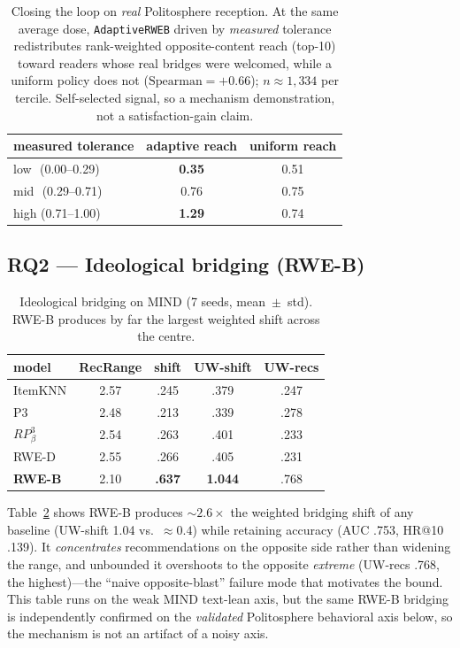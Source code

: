 \documentclass[sigconf,nonacm]{acmart}
\begin{document}
\begin{table}[t]
  \centering
  \caption{Closing the loop on \emph{real} Politosphere reception. At the same average
  dose, \texttt{AdaptiveRWEB} driven by \emph{measured} tolerance redistributes
  rank-weighted opposite-content reach (top-10) toward readers whose real bridges were
  welcomed, while a uniform policy does not ($\mathrm{Spearman}{=}{+}0.66$);
  $n{\approx}1{,}334$ per tercile. Self-selected signal, so a mechanism demonstration,
  not a satisfaction-gain claim.}
  \label{tab:loop}
  \small
  \begin{tabular}{lcc}
    \toprule
    measured tolerance & adaptive reach & uniform reach \\
    \midrule
    low\ \,(0.00--0.29)  & \textbf{0.35} & 0.51 \\
    mid\ \,(0.29--0.71)  & 0.76 & 0.75 \\
    high (0.71--1.00)    & \textbf{1.29} & 0.74 \\
    \bottomrule
  \end{tabular}
\end{table}

\subsection{RQ2 --- Ideological bridging (RWE-B)}
\begin{table}[t]
  \centering
  \caption{Ideological bridging on MIND (7 seeds, mean~$\pm$~std). RWE-B produces
  by far the largest weighted shift across the centre.}
  \label{tab:rq2}
  \small
  \begin{tabular}{lcccc}
    \toprule
    model & RecRange & shift & UW-shift & UW-recs \\
    \midrule
    ItemKNN & 2.57 & .245 & .379 & .247 \\
    P3      & 2.48 & .213 & .339 & .278 \\
    $RP^3_\beta$ & 2.54 & .263 & .401 & .233 \\
    RWE-D   & 2.55 & .266 & .405 & .231 \\
    \textbf{RWE-B} & 2.10 & \textbf{.637} & \textbf{1.044} & .768 \\
    \bottomrule
  \end{tabular}
\end{table}

Table~\ref{tab:rq2} shows RWE-B produces ${\sim}2.6\times$ the weighted bridging
shift of any baseline (UW-shift 1.04 vs.\ ${\approx}0.4$) while retaining accuracy
(AUC .753, HR@10 .139). It \emph{concentrates} recommendations on the opposite
side rather than widening the range, and unbounded it overshoots to the opposite
\emph{extreme} (UW-recs .768, the highest)---the ``naive opposite-blast'' failure
mode that motivates the bound. This table runs on the weak MIND text-lean axis, but
the same RWE-B bridging is independently confirmed on the \emph{validated}
Politosphere behavioral axis below, so the mechanism is not an artifact of a noisy
axis.
\end{document}
